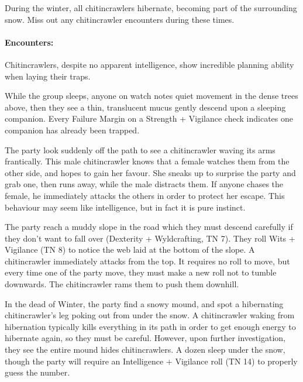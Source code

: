\begin{multicols}{2}
During the winter, all chitincrawlers hibernate, becoming part of the surrounding snow.  Miss out any chitincrawler encounters during these times.

\paragraph{Encounters:} Chitincrawlers, despite no apparent intelligence, show incredible planning ability when laying their traps.

\begin{itemize}

  \item{While the group sleeps, anyone on watch notes quiet movement in the dense trees above, then they see a thin, translucent mucus gently descend upon a sleeping companion.
  Every Failure Margin on a Strength + Vigilance check indicates one companion has already been trapped.}
  \item
  The party look suddenly off the path to see a chitincrawler waving its arms frantically.
  This male chitincrawler knows that a female watches them from the other side, and hopes to gain her favour.
  She sneaks up to surprise the party and grab one, then runs away, while the male distracts them.
  If anyone chases the female, he immediately attacks the others in order to protect her escape.
  This behaviour may seem like intelligence, but in fact it is pure instinct.
  \item{The party reach a muddy slope in the road which they must descend carefully if they don't want to fall over (Dexterity + Wyldcrafting, TN 7).
  They roll Wits + Vigilance (TN 8) to notice the web laid at the bottom of the slope.
  A chitincrawler immediately attacks from the top.
  It requires no roll to move, but every time one of the party move, they must make a new roll not to tumble downwards.
  The chitincrawler rams them to push them downhill.%
  \iftoggle{core}{%
  \footnote{\nameref{ram}. Core rules, page \pageref{ram}.}
  }{}
  \item
  In the dead of Winter, the party find a snowy mound, and spot a hibernating chitincrawler's leg poking out from under the snow.
  A chitincrawler waking from hibernation typically kills everything in its path in order to get enough energy to hibernate again, so they must be careful.
  However, upon further investigation, they see the entire mound hides chitincrawlers.
  A dozen sleep under the snow, though the party will require an Intelligence + Vigilance roll (TN 14) to properly guess the number.
  }


\end{itemize}
\end{multicols}
